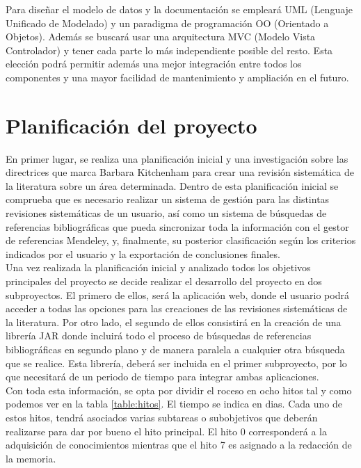Para diseñar el modelo de datos y la documentación se empleará UML (Lenguaje Unificado de Modelado) y un paradigma de programación OO (Orientado a Objetos). Además se buscará usar una arquitectura MVC (Modelo Vista Controlador) y tener cada parte lo más independiente posible del resto. Esta elección podrá permitir además una mejor integración entre todos los componentes y una mayor facilidad de mantenimiento y ampliación en el futuro.

\section{Planificación del proyecto}
En primer lugar, se realiza una planificación inicial y una investigación sobre las directrices que marca Barbara Kitchenham para crear una revisión sistemática de la literatura sobre un área determinada. Dentro de esta planificación inicial se comprueba que es necesario realizar un sistema de gestión para las distintas revisiones sistemáticas de un usuario, así como un sistema de búsquedas de referencias bibliográficas que pueda sincronizar toda la información con el gestor de referencias Mendeley, y, finalmente, su posterior clasificación según los criterios indicados por el usuario y la exportación de conclusiones finales.\\

Una vez realizada la planificación inicial y analizado todos los objetivos principales del proyecto se decide realizar el desarrollo del proyecto en dos subproyectos. El primero de ellos, será la aplicación web, donde el usuario podrá acceder a todas las opciones para las creaciones de las revisiones sistemáticas de la literatura. Por otro lado, el segundo de ellos consistirá en la creación de una librería JAR donde incluirá todo el proceso de búsquedas de referencias bibliográficas en segundo plano y de manera paralela a cualquier otra búsqueda que se realice. Esta librería, deberá ser incluida en el primer subproyecto, por lo que necesitará de un periodo de tiempo para integrar ambas aplicaciones.\\

Con toda esta información, se opta por dividir el roceso en ocho hitos tal y como podemos ver en la tabla \ref{table:hitos}. El tiempo se indica en dias. Cada uno de estos hitos, tendrá asociados varias subtareas o subobjetivos que deberán realizarse para dar por bueno el hito principal. El hito 0 corresponderá a la adquisición de conocimientos mientras que el hito 7 es asignado a la redacción de la memoria.\\

